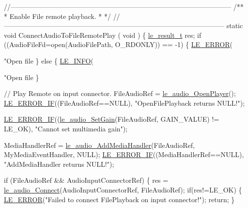 \begin{DoxyCodeInclude}
{\textcolor{comment}{//--------------------------------------------------------------------------------------------------}\textcolor{comment}{}
\textcolor{comment}{/**}
\textcolor{comment}{ * Enable File remote playback.}
\textcolor{comment}{ *}
\textcolor{comment}{ */}
\textcolor{comment}{//--------------------------------------------------------------------------------------------------}
\textcolor{keyword}{static} \textcolor{keywordtype}{void} ConnectAudioToFileRemotePlay
(
    \textcolor{keywordtype}{void}
)
\{
    \hyperlink{le__basics_8h_a1cca095ed6ebab24b57a636382a6c86c}{le\_result\_t} res;
    \textcolor{keywordflow}{if} ((AudioFileFd=open(AudioFilePath, O\_RDONLY)) == -1)
    \{
        \hyperlink{le__log_8h_a353590f91b3143a7ba3a416ae5a50c3d}{LE\_ERROR}(\textcolor{stringliteral}{"Open file %
    \}
    \textcolor{keywordflow}{else}
    \{
        \hyperlink{le__log_8h_a23e6d206faa64f612045d688cdde5808}{LE\_INFO}(\textcolor{stringliteral}{"Open file %
    \}

    \textcolor{comment}{// Play Remote on input connector.}
    FileAudioRef = \hyperlink{le__audio__interface_8h_a92eb1b6377f50ff07b97c5b8546f01ec}{le\_audio\_OpenPlayer}();
    \hyperlink{le__log_8h_aceaf11a11691d6c676e36dd317b38dbd}{LE\_ERROR\_IF}((FileAudioRef==NULL), \textcolor{stringliteral}{"OpenFilePlayback returns NULL!"});

    \hyperlink{le__log_8h_aceaf11a11691d6c676e36dd317b38dbd}{LE\_ERROR\_IF}((\hyperlink{le__audio__interface_8h_a65f11540e6af03a3494b6b9be76ba5fc}{le\_audio\_SetGain}(FileAudioRef, GAIN\_VALUE) != LE\_OK), \textcolor{stringliteral}{"Cannot
       set multimedia gain"});

    MediaHandlerRef = \hyperlink{le__audio__interface_8h_a9996ac9d23333cf8219f28b69cac4f81}{le\_audio\_AddMediaHandler}(FileAudioRef, MyMediaEventHandler, 
      NULL);
    \hyperlink{le__log_8h_aceaf11a11691d6c676e36dd317b38dbd}{LE\_ERROR\_IF}((MediaHandlerRef==NULL), \textcolor{stringliteral}{"AddMediaHandler returns NULL!"});

    \textcolor{keywordflow}{if} (FileAudioRef && AudioInputConnectorRef)
    \{
        res = \hyperlink{le__audio__interface_8h_a338df65b2fb1ae0140d86880adbcf0de}{le\_audio\_Connect}(AudioInputConnectorRef, FileAudioRef);
        \textcolor{keywordflow}{if}(res!=LE\_OK)
        \{
            \hyperlink{le__log_8h_a353590f91b3143a7ba3a416ae5a50c3d}{LE\_ERROR}(\textcolor{stringliteral}{"Failed to connect FilePlayback on input connector!"});
            \textcolor{keywordflow}{return};
        \}

}}}
\end{DoxyCodeInclude}
